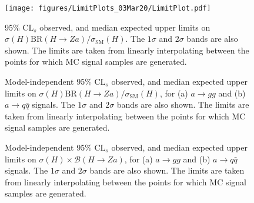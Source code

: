 \documentclass[NOTE, atlasdraft=true, texlive=2017, UKenglish]{\ATLASLATEXPATH atlasdoc}
\begin{document}
\begin{figure}[!htbp]
  \centering
  \texttt{[image: figures/LimitPlots\_03Mar20/LimitPlot.pdf]}
  \caption{95\% $\text{CL}_s$ observed, and median expected upper limits on $\sigma(H) \text{BR}(H\to Za) / \sigma_\text{SM}(H)$. The $1\sigma$ and $2\sigma$ bands are also shown. The limits are taken from linearly interpolating between the points for which MC signal samples are generated.}
  \label{fig:observedmodeldepedentresults}
\end{figure}

\begin{figure}[!htbp]
  \centering
  \caption{Model-independent 95\% $\text{CL}_s$ observed, and median expected upper limits on $\sigma(H) \text{BR}(H\to Za) / \sigma_\text{SM}(H)$, for (a) $a\to gg$ and (b) $a\to q\bar q$ signals. The $1\sigma$ and $2\sigma$ bands are also shown. The limits are taken from linearly interpolating between the points for which MC signal samples are generated.}
  \label{fig:observedmodelindepedentresults}
\end{figure}

\begin{figure}[!htbp]
  \centering
  \caption{Model-independent 95\% $\text{CL}_s$ observed, and median expected upper limits on $\sigma(H) \times\mathcal{B}(H\to Za)$, for (a) $a\to gg$ and (b) $a\to q\bar q$ signals. The $1\sigma$ and $2\sigma$ bands are also shown. The limits are taken from linearly interpolating between the points for which MC signal samples are generated.}
  \label{fig:observedmodelindepedentresultsxsecxbr}
\end{figure}
\end{document}
